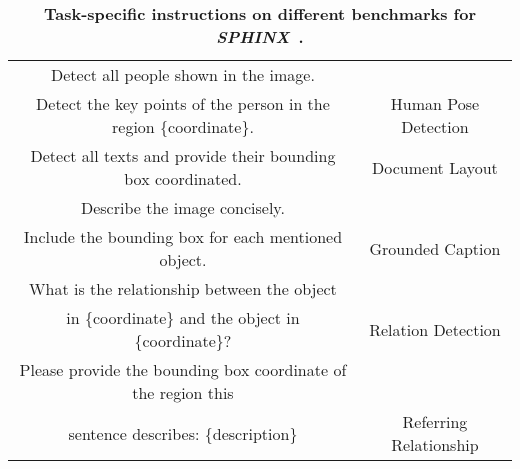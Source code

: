 \documentclass{article} \usepackage{iclr2024_conference,times}
\newcommand{\sphinx}{\textcolor{Goldenrod3}{\textbf{\textit{SPHINX}}}~}
\begin{document}
\begin{table}[]
{\begin{tabular}{c|c}
Detect all people shown in the image.\\ Detect the key points of the person in the region \{coordinate\}.             & Human Pose Detection \\ \cmidrule(lr){1-1}\cmidrule(lr){2-2}
Detect all texts and provide their bounding box coordinated.  & Document Layout \\ \cmidrule(lr){1-1}\cmidrule(lr){2-2}
Describe the image concisely. \\Include the bounding box for each mentioned object.  & Grounded Caption \\ \cmidrule(lr){1-1}\cmidrule(lr){2-2}
What is the relationship between the object \\in \{coordinate\} and the object in \{coordinate\}?  & Relation Detection \\ \cmidrule(lr){1-1}\cmidrule(lr){2-2}
Please provide the bounding box coordinate of the region this \\ sentence describes: \{description\}  &  Referring Relationship \\ \bottomrule
\end{tabular}
} \caption{\textbf{Task-specific instructions on different benchmarks for \sphinx.}}
\label{table:prompt}
\end{table}
\end{document}
